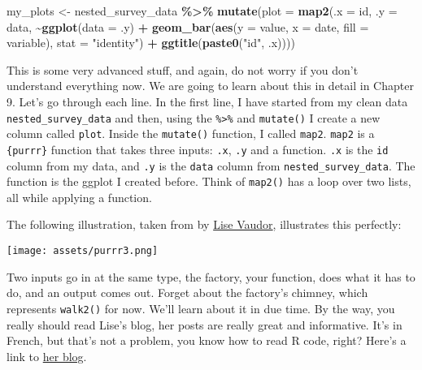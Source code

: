 \documentclass[
]{article}
\newenvironment{Shaded}{\begin{snugshade}}{\end{snugshade}}
\newcommand{\DataTypeTok}[1]{\textcolor[rgb]{0.13,0.29,0.53}{#1}}
\newcommand{\KeywordTok}[1]{\textcolor[rgb]{0.13,0.29,0.53}{\textbf{#1}}}
\newcommand{\NormalTok}[1]{#1}
\newcommand{\OperatorTok}[1]{\textcolor[rgb]{0.81,0.36,0.00}{\textbf{#1}}}
\newcommand{\StringTok}[1]{\textcolor[rgb]{0.31,0.60,0.02}{#1}}
\begin{document}
\begin{Shaded}
\begin{Highlighting}[]
\NormalTok{my\_plots \textless{}{-}}\StringTok{ }\NormalTok{nested\_survey\_data }\OperatorTok{\%\textgreater{}\%}
\StringTok{    }\KeywordTok{mutate}\NormalTok{(}\DataTypeTok{plot =} \KeywordTok{map2}\NormalTok{(}\DataTypeTok{.x =}\NormalTok{ id,}
                       \DataTypeTok{.y =}\NormalTok{ data,}
                       \OperatorTok{\textasciitilde{}}\KeywordTok{ggplot}\NormalTok{(}\DataTypeTok{data =}\NormalTok{ .y) }\OperatorTok{+}
\StringTok{                           }\KeywordTok{geom\_bar}\NormalTok{(}\KeywordTok{aes}\NormalTok{(}\DataTypeTok{y =}\NormalTok{ value, }\DataTypeTok{x =}\NormalTok{ date, }\DataTypeTok{fill =}\NormalTok{ variable), }\DataTypeTok{stat =} \StringTok{"identity"}\NormalTok{) }\OperatorTok{+}
\StringTok{                           }\KeywordTok{ggtitle}\NormalTok{(}\KeywordTok{paste0}\NormalTok{(}\StringTok{"id"}\NormalTok{, .x))))}
\end{Highlighting}
\end{Shaded}

This is some very advanced stuff, and again, do not worry if you don't understand everything now.
We are going to learn about this in detail in Chapter 9. Let's go through each line.
In the first line, I have started from my clean data \texttt{nested\_survey\_data} and then, using the \texttt{\%\textgreater{}\%}
and \texttt{mutate()} I create a new column called \texttt{plot}. Inside the \texttt{mutate()} function, I called \texttt{map2}.
\texttt{map2} is a \texttt{\{purrr\}} function that takes three inputs: \texttt{.x}, \texttt{.y} and a function. \texttt{.x} is the \texttt{id}
column from my data, and \texttt{.y} is the \texttt{data} column from \texttt{nested\_survey\_data}. The function is the
ggplot I created before. Think of \texttt{map2()} has a loop over two lists, all while applying a function.

The following illustration, taken from \citet{vaudor_purrr_2018} by
\href{https://twitter.com/LVaudor}{Lise Vaudor}, illustrates this perfectly:

\texttt{[image: assets/purrr3.png]}

Two inputs go in at the same type, the factory, your function, does what it has to do, and an
output comes out. Forget about the factory's chimney, which represents \texttt{walk2()} for now. We'll
learn about it in due time. By the way, you really should read Lise's blog, her posts are really
great and informative. It's in French, but that's not a problem, you know how to read R code, right?
Here's a link to \href{http://perso.ens-lyon.fr/lise.vaudor/}{her blog}.
\end{document}
